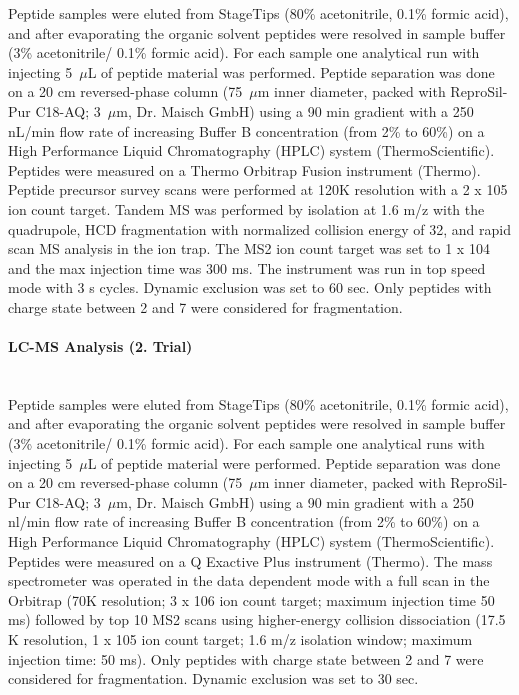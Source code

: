 \documentclass[a4paper,11pt,bibtotocnumbered]{article}
\begin{document}
Peptide samples were eluted from StageTips (80\% acetonitrile, 0.1\% formic acid), and after evaporating the organic solvent peptides were resolved in sample buffer (3\% acetonitrile/ 0.1\% formic acid). For each sample one analytical run with injecting 5~$\mu$L of peptide material was performed.  Peptide separation was done on a 20 cm reversed-phase column (75~$\mu$m inner diameter, packed with ReproSil-Pur C18-AQ; 3~$\mu$m, Dr. Maisch GmbH) using a 90 min gradient with a 250 nL/min flow rate of increasing Buffer B concentration (from 2\% to 60\%) on a High Performance Liquid Chromatography (HPLC) system (ThermoScientific). Peptides were measured on a Thermo Orbitrap Fusion instrument (Thermo). Peptide precursor survey scans were performed at 120K resolution with a 2 x 105 ion count target. Tandem MS was performed by isolation at 1.6 m/z with the quadrupole, HCD fragmentation with normalized collision energy of 32, and rapid scan MS analysis in the ion trap. The MS2 ion count target was set to 1 x 104 and the max injection time was 300 ms. The instrument was run in top speed mode with 3 s cycles. Dynamic exclusion was set to 60 sec. Only peptides with charge state between 2 and 7 were considered for fragmentation.

\paragraph{LC-MS Analysis (2. Trial)} $~$ \\

Peptide samples were eluted from StageTips (80\% acetonitrile, 0.1\% formic acid), and after evaporating the organic solvent peptides were resolved in sample buffer (3\% acetonitrile/ 0.1\% formic acid). For each sample one analytical runs with injecting 5~$\mu$L of peptide material were performed. Peptide separation was done on a 20 cm reversed-phase column (75~$\mu$m inner diameter, packed with ReproSil-Pur C18-AQ; 3~$\mu$m, Dr. Maisch GmbH) using a 90 min gradient with a 250 nl/min flow rate of increasing Buffer B concentration (from 2\% to 60\%) on a High Performance Liquid Chromatography (HPLC) system (ThermoScientific). Peptides were measured on a Q Exactive Plus instrument (Thermo). The mass spectrometer was operated in the data dependent mode with a full scan in the Orbitrap (70K resolution; 3 x 106 ion count target; maximum injection time 50 ms) followed by top 10 MS2 scans using higher-energy collision dissociation (17.5 K resolution, 1 x 105 ion count target; 1.6 m/z isolation window; maximum injection time: 50 ms). Only peptides with charge state between 2 and 7 were considered for fragmentation. Dynamic exclusion was set to 30 sec.
\end{document}
